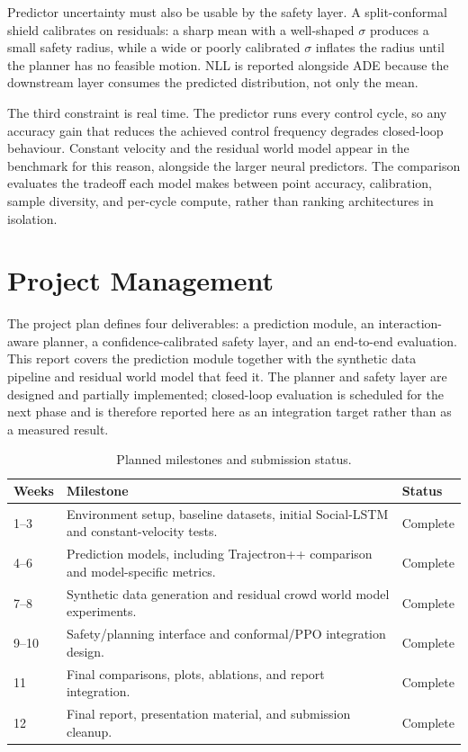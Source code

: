 \documentclass[conference]{IEEEtran}
\begin{document}
Predictor uncertainty must also be usable by the safety layer. A
split-conformal shield calibrates on residuals: a sharp mean with a
well-shaped $\sigma$ produces a small safety radius, while a wide or
poorly calibrated $\sigma$ inflates the radius until the planner has
no feasible motion. NLL is reported alongside ADE because the
downstream layer consumes the predicted distribution, not only the
mean.

The third constraint is real time. The predictor runs every control
cycle, so any accuracy gain that reduces the achieved control
frequency degrades closed-loop behaviour. Constant velocity and the
residual world model appear in the benchmark for this reason,
alongside the larger neural predictors. The comparison evaluates the
tradeoff each model makes between point accuracy, calibration,
sample diversity, and per-cycle compute, rather than ranking
architectures in isolation.

\section{Project Management}

The project plan defines four deliverables: a prediction module, an
interaction-aware planner, a confidence-calibrated safety layer, and
an end-to-end evaluation. This report covers the prediction module
together with the synthetic data pipeline and residual world model
that feed it. The planner and safety layer are designed and partially
implemented; closed-loop evaluation is scheduled for the next phase
and is therefore reported here as an integration target rather than
as a measured result.

\begin{table}[t]
\caption{Planned milestones and submission status.}
\label{tab:timeline}
\centering
\scriptsize
\setlength{\tabcolsep}{3pt}
\renewcommand{\arraystretch}{1.12}
\begin{tabularx}{\columnwidth}{@{}p{0.9cm}X p{1.45cm}@{}}
\toprule
\textbf{Weeks} & \textbf{Milestone} & \textbf{Status} \\
\midrule
1--3 & Environment setup, baseline datasets, initial Social-LSTM and constant-velocity tests. & Complete \\
4--6 & Prediction models, including Trajectron++ comparison and model-specific metrics. & Complete \\
7--8 & Synthetic data generation and residual crowd world model experiments. & Complete \\
9--10 & Safety/planning interface and conformal/PPO integration design. & Complete \\
11 & Final comparisons, plots, ablations, and report integration. & Complete \\
12 & Final report, presentation material, and submission cleanup. & Complete \\
\bottomrule
\end{tabularx}
\end{table}
\end{document}
